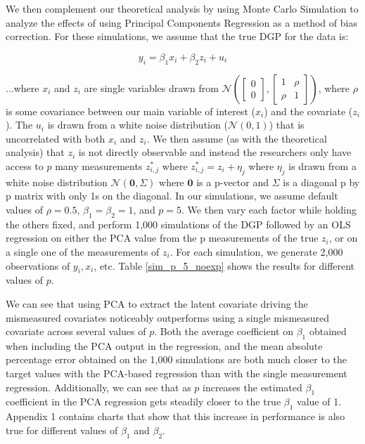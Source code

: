\documentclass[10pt]{article}
\begin{document}
We then complement our theoretical analysis by using Monte Carlo Simulation to analyze the effects of using Principal Components Regression as a method of bias correction. For these simulations, we assume that the true DGP for the data is:

$$y_i = \beta_1 x_i + \beta_2 z_i + u_i$$

...where $x_i$ and $z_i$ are single variables drawn from $\mathcal{N}(\begin{bmatrix} 0\\ 0 \end{bmatrix}, \begin{bmatrix} 1 & \rho\\ \rho & 1\end{bmatrix})$, where $\rho$ is some covariance between our main variable of interest ($x_i$) and the covariate ($z_i$). The $u_i$ is drawn from a white noise distribution ($\mathcal{N}(0,1)$) that is uncorrelated with both $x_i$ and $z_i$. We then assume (as with the theoretical analysis) that $z_i$ is not directly observable and instead the researchers only have access to $p$ many measurements $z_{i,j}^*$ where $z_{i,j}^* = z_i + \eta_j$ where $\eta_j$ is drawn from a white noise distribution $\mathcal{N}(\mathbf{0},\Sigma)$ where $\mathbf{0}$ is a p-vector and $\Sigma$ is a diagonal p by p matrix with only 1s on the diagonal.
In our simulations, we assume default values of $\rho = 0.5$, $\beta_1 = \beta_2 = 1$, and $p=5$. We then vary each factor while holding the others fixed, and perform 1,000 simulations of the DGP followed by an OLS regression on either the PCA value from the p measurements of the true $z_i$, or on a single one of the measurements of $z_i$. For each simulation, we generate 2,000 observations of $y_i,x_i$, etc. Table \ref{sim_p_5_noexp} shows the results for different values of $p$.



We can see that using PCA to extract the latent covariate driving the mismeasured covariates noticeably outperforms using a single mismeasured covariate across several values of $p$. Both the average coefficient on $\beta_1$ obtained when including the PCA output in the regression, and the mean absolute percentage error obtained on the 1,000 simulations are both much closer to the target values with the PCA-based regression than with the single measurement regression. Additionally, we can see that as $p$ increases the estimated $\beta_1$ coefficient in the PCA regression gets steadily closer to the true $\beta_1$ value of 1. Appendix 1 contains charts that show that this increase in performance is also true for different values of $\beta_1$ and $\beta_2$.
\end{document}
